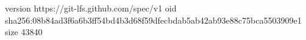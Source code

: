 version https://git-lfs.github.com/spec/v1
oid sha256:08b84ad3f6a6b3ff54bd4b3d68f59dfecbdab5ab42ab93e88c75bca5503909e1
size 43840
